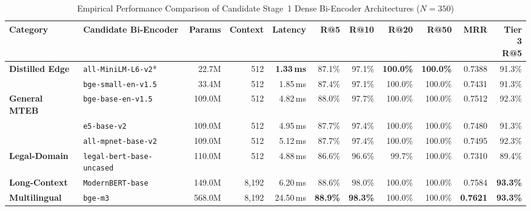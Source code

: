 \clearpage
\begin{landscape}
\begin{table}[p]
    \centering
    \footnotesize
    \setlength{\tabcolsep}{5.0pt}
    \renewcommand{\arraystretch}{0.96}
    \caption[Performance Comparison of Candidate Dense Bi-Encoder Architectures]{Empirical Performance Comparison of Candidate Stage~1 Dense Bi-Encoder Architectures ($N = 350$)}
    \label{tab:stage1_dense_model_benchmark}
    \begin{tabularx}{\linewidth}{>{\RaggedRight\arraybackslash}p{2.8cm}>{\RaggedRight\arraybackslash}p{4.5cm}rrrrrrrrr}
        \toprule
        \textbf{Category} & \textbf{Candidate Bi-Encoder} & \textbf{Params} & \textbf{Context} & \textbf{Latency} & \textbf{R@5} & \textbf{R@10} & \textbf{R@20} & \textbf{R@50} & \textbf{MRR} & \shortstack[r]{\textbf{Tier 3}\\\textbf{R@5}} \\
        \midrule
        \textbf{Distilled Edge} & \texttt{all-MiniLM-L6-v2}* & 22.7M & 512 & \textbf{1.33\,ms} & 87.1\% & 97.1\% & \textbf{100.0\%} & \textbf{100.0\%} & 0.7388 & 91.3\% \\
        & \texttt{bge-small-en-v1.5} & 33.4M & 512 & 1.85\,ms & 87.4\% & 97.1\% & 100.0\% & 100.0\% & 0.7431 & 91.3\% \\
        \midrule
        \textbf{General MTEB} & \texttt{bge-base-en-v1.5} & 109.0M & 512 & 4.82\,ms & 88.0\% & 97.7\% & 100.0\% & 100.0\% & 0.7512 & 92.3\% \\
        & \texttt{e5-base-v2} & 109.0M & 512 & 4.95\,ms & 87.7\% & 97.4\% & 100.0\% & 100.0\% & 0.7480 & 91.3\% \\
        & \texttt{all-mpnet-base-v2} & 109.0M & 512 & 5.12\,ms & 87.7\% & 97.4\% & 100.0\% & 100.0\% & 0.7495 & 92.3\% \\
        \midrule
        \textbf{Legal-Domain} & \texttt{legal-bert-base-uncased} & 110.0M & 512 & 4.88\,ms & 86.6\% & 96.6\% & 99.7\% & 100.0\% & 0.7310 & 89.4\% \\
        \midrule
        \textbf{Long-Context} & \texttt{ModernBERT-base} & 149.0M & 8,192 & 6.20\,ms & 88.6\% & 98.0\% & 100.0\% & 100.0\% & 0.7584 & \textbf{93.3\%} \\
        \midrule
        \textbf{Multilingual} & \texttt{bge-m3} & 568.0M & 8,192 & 24.50\,ms & \textbf{88.9\%} & \textbf{98.3\%} & 100.0\% & 100.0\% & \textbf{0.7621} & \textbf{93.3\%} \\
        \bottomrule
    \end{tabularx}
\end{table}

\end{landscape}
\clearpage

